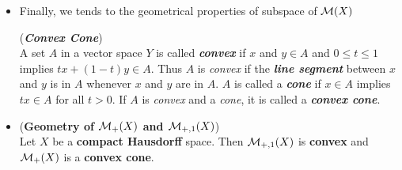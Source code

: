 \documentclass[11pt]{article}
\begin{document}
\begin{itemize}
\item Finally, we tends to the geometrical properties of subspace of ${\mathcal M}(X)$
\begin{definition} (\emph{\textbf{Convex Cone}})\\
A set $A$ in a vector space $Y$ is called \emph{\textbf{convex}} if $x$ and $y \in A$  and $0 \le t \le 1$ implies $tx + (1 - t)y \in A$. Thus $A$ is \emph{convex} if the \emph{\textbf{line segment}}  between $x$ and $y$ is in $A$ whenever $x$ and $y$ are in $A$. $A$ is called a \emph{\textbf{cone}} if $x \in A$ implies $tx \in A$ for all $t > 0$. If $A$ is \emph{convex} and a \emph{cone}, it is called  a \emph{\textbf{convex cone}}. 
\end{definition}

\item \begin{proposition} (\textbf{Geometry of ${\mathcal M}_{+}(X)$ and ${\mathcal M}_{+,1}(X)$}) \citep{reed1980methods}\\
Let $X$ be a \textbf{compact Hausdorff} space. Then ${\mathcal M}_{+,1}(X)$ is \textbf{convex} and ${\mathcal M}_{+}(X)$ is a \textbf{convex cone}. 
\end{proposition}
\end{itemize}
\end{document}
